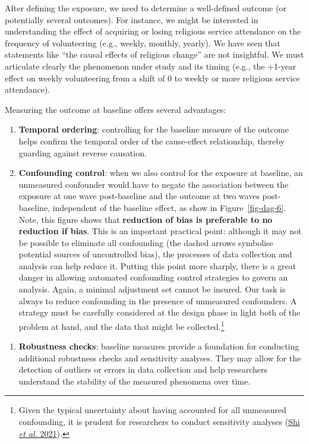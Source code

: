 \documentclass[
  singlecolumn]{article}
\providecommand{\tightlist}{%
  \setlength{\itemsep}{0pt}\setlength{\parskip}{0pt}}\usepackage{longtable,booktabs,array}
\begin{document}
After defining the exposure, we need to determine a well-defined outcome
(or potentially several outcomes). For instance, we might be interested
in understanding the effect of acquiring or losing religious service
attendance on the frequency of volunteering (e.g., weekly, monthly,
yearly). We have seen that statements like ``the causal effects of
religious change'' are not insightful. We must articulate clearly the
phenomenon under study and its timing (e.g., the +1-year effect on
weekly volunteering from a shift of 0 to weekly or more religious
service attendance).

Measuring the outcome at baseline offers several advantages:

\begin{enumerate}
\def\labelenumi{\alph{enumi}.}
\item
  \textbf{Temporal ordering}: controlling for the baseline measure of
  the outcome helps confirm the temporal order of the cause-effect
  relationship, thereby guarding against reverse causation.
\item
  \textbf{Confounding control}: when we also control for the exposure at
  baseline, an unmeasured confounder would have to negate the
  association between the exposure at one wave post-baseline and the
  outcome at two waves post-baseline, independent of the baseline
  effect, as show in Figure~\ref{fig-dag-6}. Note, this figure shows
  that \textbf{reduction of bias is preferable to no reduction if bias}.
  This is an important practical point: although it may not be possible
  to eliminate all confounding (the dashed arrows symbolise potential
  sources of uncontrolled bias), the processes of data collection and
  analysis can help reduce it. Putting this point more sharply, there is
  a great danger in allowing automated confounding control strategies to
  govern an analysis. Again, a minimal adjustment set cannot be insured.
  Our task is always to reduce confounding in the presence of unmeasured
  confounders. A strategy must be carefully considered at the design
  phase in light both of the problem at hand, and the data that might be
  collected.\footnote{Given the typical uncertainty about having
    accounted for all unmeasured confounding, it is prudent for
    researchers to conduct sensitivity analyses
    (\protect\hyperlink{ref-shi2021}{Shi \emph{et al.} 2021}).}
\end{enumerate}

\begin{enumerate}
\def\labelenumi{\alph{enumi}.}
\setcounter{enumi}{2}
\tightlist
\item
  \textbf{Robustness checks}: baseline measures provide a foundation for
  conducting additional robustness checks and sensitivity analyses. They
  may allow for the detection of outliers or errors in data collection
  and help researchers understand the stability of the measured
  phenomena over time.
\end{enumerate}
\end{document}
